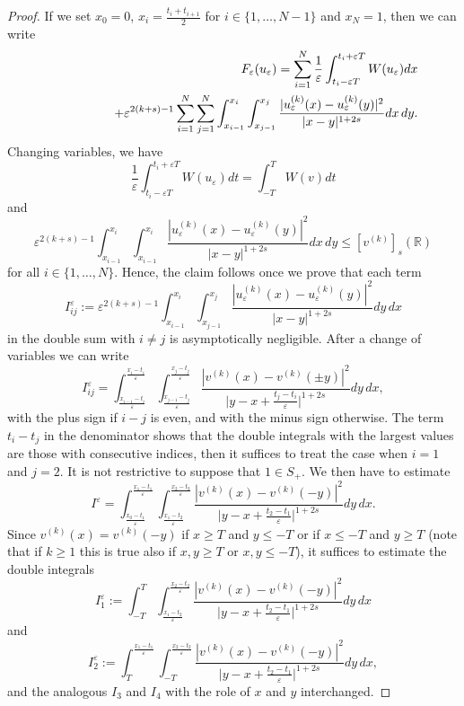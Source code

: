 \documentclass{article}
\newcommand{\e}{\varepsilon}
\begin{document}
\begin{proof}
If we set $x_0=0$, $x_i=\frac{t_i+t_{i+1}}2$ for $i\in\{1,\ldots, N-1\}$ and $x_N=1$, 
then we can write
\begin{eqnarray*}
&&F_\e(u_\e)=\sum_{i=1}^N\frac1\e\int_{t_i-\e T}^{t_i+\e T}W(u_\e)dx 
\\&&\hskip1.5cm+\e^{2(k+s)-1}
\sum_{i=1}^N\sum_{j=1}^N\int_{x_{i-1}}^{x_i}\int_{x_{j-1}}^{x_j}\frac{|u^{(k)}_\e(x)-
u^{(k)}_\e(y)|^2}{|x-y|^{1+2s}}dx\,dy.
\end{eqnarray*}
Changing variables, we have 
$$
\frac1\e\int_{t_i-\e T}^{t_i+\e T}W(u_\e)dt= \int_{-T}^T W(v)dt
$$
and 
$$
\e^{2(k+s)-1}\int_{x_{i-1}}^{x_i}\int_{x_{i-1}}^{x_i}\frac{|u^{(k)}_\e(x)-
u^{(k)}_\e(y)|^2}{|x-y|^{1+2s}}dx\,dy\le [v^{(k)}]_{s}(\mathbb R)
$$
 for all $i\in\{1,\ldots, N\}$.
Hence, the claim follows once we prove that each term
\begin{equation}\label{Iij} I^\e_{ij}:=
\e^{2(k+s)-1}\int_{x_{i-1}}^{x_i}\int_{x_{j-1}}^{x_j}\frac{|u^{(k)}_\e(x)-
u^{(k)}_\e(y)|^2}{|x-y|^{1+2s}}dy\,dx
\end{equation}
in the double sum with $i\neq j$ is asymptotically negligible. After a change of variables we can write
$$
I^\e_{ij}=\int_{\frac{x_{i-1}-t_i}\e}^{\frac{x_i-t_i}\e}\int_{\frac{x_{j-1}-t_j}\e}^{\frac{x_j-t_j}\e} \frac{|v^{(k)}(x)-
v^{(k)}(\pm y)|^2}{\big|y-x+\frac{t_j-t_i}\e \big|^{1+2s}}dy\,dx,
$$
with the plus sign if $i-j$ is even, and with the minus sign otherwise. The term $t_i-t_j$ in the denominator shows that the double integrals with the largest values are those with consecutive indices, then it suffices to treat the case when $i=1$ and $j=2$.  It is not restrictive to suppose that $1\in S_+$. We then have to estimate 
$$
I^\e=\int_{\frac{x_0-t_1}\e}^{\frac{x_1-t_1}\e}\int_{\frac{x_1-t_2}\e}^{\frac{x_2-t_2}\e} \frac{|v^{(k)}(x)-
v^{(k)}(-y)|^2}{\big|y-x+\frac{t_2-t_1}\e \big|^{1+2s}}dy\,dx.
$$
Since $v^{(k)}(x)=v^{(k)}(-y)$ if $x\ge T$ and $y\le -T$ or  if $x\le -T$ and $y\ge T$ (note that if $k\ge 1$ this is true also if $x,y\ge T$ or $x,y\le -T$), it suffices to estimate the double integrals
$$
I^\e_1:=\int_{-T}^{T}\int_{\frac{x_1-t_2}\e}^{\frac{x_2-t_2}\e} \frac{|v^{(k)}(x)-
v^{(k)}(-y)|^2}{\big|y-x+\frac{t_2-t_1}\e \big|^{1+2s}}dy\,dx
$$
and 
$$
I^\e_2:=\int_{T}^{\frac{x_1-t_1}\e}\int_{-T}^{\frac{x_2-t_2}\e} \frac{|v^{(k)}(x)-
v^{(k)}(-y)|^2}{\big|y-x+\frac{t_2-t_1}\e \big|^{1+2s}}dy\,dx,
$$
and the analogous $I_3$ and $I_4$ with the role of $x$ and $y$ interchanged.


\end{proof}
\end{document}
